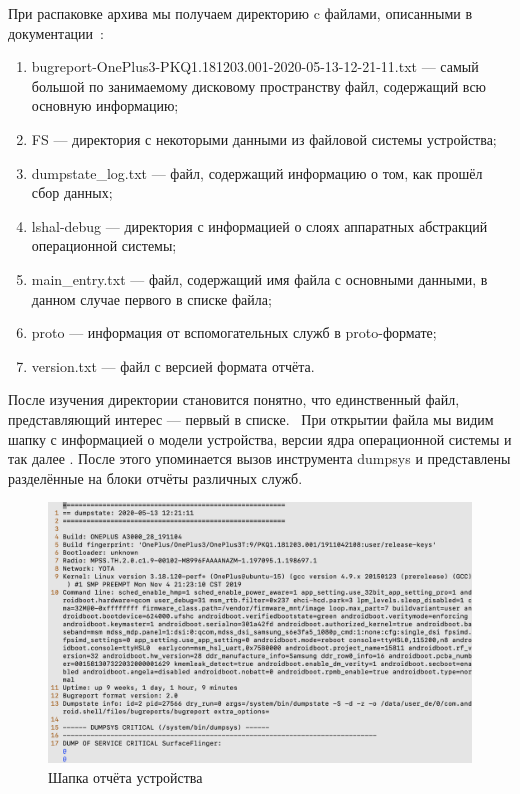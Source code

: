 \documentclass[a4paper,14pt]{extarticle} %
\begin{document}
	При распаковке архива мы получаем директорию c файлами, описанными в документации~\parencite{BugreportFormat}:
	\begin{enumerate}
		\item bugreport-OnePlus3-PKQ1.181203.001-2020-05-13-12-21-11.txt --- самый большой по занимаемому дисковому пространству файл, содержащий всю основную информацию;
		\item FS --- директория с некоторыми данными из файловой системы устройства;
		\item dumpstate\_log.txt --- файл, содержащий информацию о том, как прошёл сбор данных;
		\item lshal-debug --- директория с информацией о слоях аппаратных абстракций операционной системы;
		\item main\_entry.txt --- файл, содержащий имя файла с основными данными, в данном случае первого в списке файла;
		\item proto --- информация от вспомогательных служб в proto-формате;
		\item version.txt --- файл с версией формата отчёта.
	\end{enumerate}

	После изучения директории становится понятно, что единственный файл, представляющий интерес --- первый в списке.  При открытии файла мы видим шапку с информацией о модели устройства, версии ядра операционной системы и так далее \ris{\ref{fig:report_header}}. После этого упоминается вызов инструмента dumpsys и представлены разделённые на блоки отчёты различных служб. 
	
	\begin{figure}[H]
		\includegraphics[width=\textwidth]{report_header}
		\caption{Шапка отчёта устройства}
		\label{fig:report_header}
	\end{figure}
\end{document}
